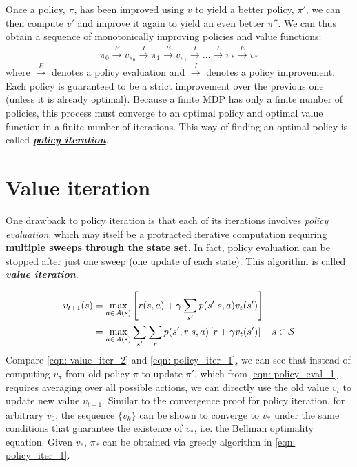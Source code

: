 \documentclass[11pt]{article}
\begin{document}
Once a policy, $\pi$, has been improved using $v$ to yield a better policy, $\pi'$, we can then compute $v'$ and improve it again to yield an even better $\pi''$. We can thus obtain a sequence of monotonically improving policies and value functions:
\begin{align*}
\pi_{0} \xrightarrow{E} v_{\pi_0} \xrightarrow{I} \pi_{1} \xrightarrow{E} v_{\pi_1}  \xrightarrow{I} \ldots \xrightarrow{I} \pi_{*} \xrightarrow{E} v_{*}
\end{align*} where $ \xrightarrow{E}$ denotes a policy evaluation and $\xrightarrow{I}$ denotes a policy improvement. Each policy is guaranteed to be a strict improvement over the previous one (unless it is already optimal). Because a finite MDP has only a finite number of policies, this process must converge to an optimal policy and optimal value function in a finite number of iterations. This way of finding an optimal policy is called \underline{\emph{\textbf{policy iteration}}}.




\section{Value iteration} 
One drawback to policy iteration is that each of its iterations involves \emph{policy evaluation}, which may itself be a protracted iterative computation requiring \textbf{multiple sweeps through the state set}. In fact, policy evaluation can be stopped after just one sweep (one update of each state). This algorithm is called \textit{\textbf{value iteration}}. 

\begin{align}
v_{t+1}(s)&=  \max_{a\in {\mathcal A}(s)}\left[r(s, a) + \gamma \sum_{s'}p(s'|s, a)v_{t}(s')\right] \label{eqn: value_iter_1}\\
&= \max_{a\in {\mathcal A}(s)}\sum_{s'}\sum_{r}p(s', r|s, a)\left[r + \gamma v_{t}(s')\right] \quad s\in {\mathcal S} \label{eqn: value_iter_2}
\end{align} Compare \eqref{eqn: value_iter_2} and \eqref{eqn: policy_iter_1}, we can see that instead of computing $v_{\pi}$ from old policy $\pi$ to update $\pi'$, which from \eqref{eqn: policy_eval_1} requires averaging over all possible actions, we can directly use the old value $v_{t}$ to update new value $v_{t+1}$. Similar to the convergence proof for policy iteration, for arbitrary $v_{0}$, the sequence $\{v_k\}$ can be shown to converge to $v_{*}$ under the same conditions that guarantee the existence of $v_{*}$, i.e. the Bellman optimality equation. Given $v_{*}$, $\pi_{*}$ can be obtained via greedy algorithm in \eqref{eqn: policy_iter_1}.
\end{document}
